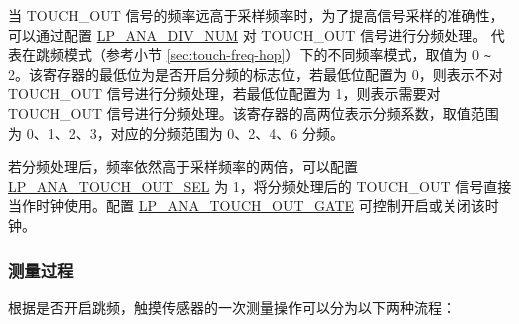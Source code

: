 \documentclass[main\_\_CN.tex]{subfiles}
\begin{document}
当 TOUCH\_OUT 信号的频率远高于采样频率时，为了提高信号采样的准确性，可以通过配置 \hyperref[fielddesc:LPANADIVNUM0]{LP\_ANA\_DIV\_NUM} 对 TOUCH\_OUT 信号进行分频处理。 代表在跳频模式（参考小节 \ref{sec:touch-freq-hop}）下的不同频率模式，取值为 0 \verb+~+ 2。该寄存器的最低位为是否开启分频的标志位，若最低位配置为 0，则表示不对 TOUCH\_OUT 信号进行分频处理，若最低位配置为 1，则表示需要对 TOUCH\_OUT 信号进行分频处理。该寄存器的高两位表示分频系数，取值范围为 0、1、2、3，对应的分频范围为 0、2、4、6 分频。

若分频处理后，频率依然高于采样频率的两倍，可以配置 \hyperref[fielddesc:LPANATOUCHOUTSEL]{LP\_ANA\_TOUCH\_OUT\_SEL} 为 1，将分频处理后的 TOUCH\_OUT 信号直接当作时钟使用。配置 \hyperref[fielddesc:LPANATOUCHOUTGATE]{LP\_ANA\_TOUCH\_OUT\_GATE} 可控制开启或关闭该时钟。

\subsubsection{测量过程}
\label{para:measurement-process}

根据是否开启跳频，触摸传感器的一次测量操作可以分为以下两种流程：
\end{document}
